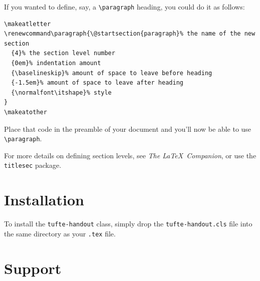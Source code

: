 \documentclass[nofonts]{tufte-handout}
\begin{document}
If you wanted to define, say, a \Verb|\paragraph| heading, you could do it
as follows:

\begin{Verbatim}
\makeatletter
\renewcommand\paragraph{\@startsection{paragraph}% the name of the new section
  {4}% the section level number
  {0em}% indentation amount
  {\baselineskip}% amount of space to leave before heading
  {-1.5em}% amount of space to leave after heading
  {\normalfont\itshape}% style
}
\makeatother
\end{Verbatim}

Place that code in the preamble of your document and you'll now be able to use
\Verb|\paragraph|.  

For more details on defining section levels, see \textit{The \LaTeX\
Companion},\cite{Mittelbach2004} or use the \Verb|titlesec| package.


\section{Installation}\label{sec:installation}
To install the \Verb|tufte-handout| class, simply drop the
\Verb|tufte-handout.cls| file into the same directory as your \Verb|.tex|
file.



\section{Support}\label{sec:support}
\end{document}
